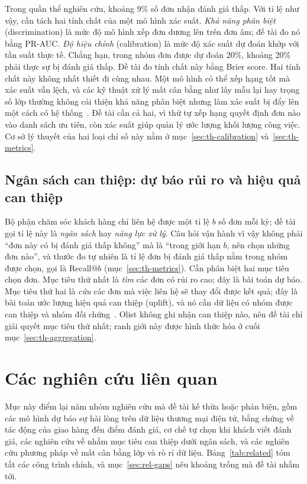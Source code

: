 \documentclass[12pt,a4paper]{report}
\begin{document}
Trong quần thể nghiên cứu, khoảng 9\% số đơn nhận đánh giá thấp. Với tỉ lệ như vậy, cần tách hai tính chất của một mô hình xác suất. \emph{Khả năng phân biệt} (discrimination) là mức độ mô hình xếp đơn dương lên trên đơn âm; đề tài đo nó bằng PR-AUC. \emph{Độ hiệu chỉnh} (calibration) là mức độ xác suất dự đoán khớp với tần suất thực tế. Chẳng hạn, trong nhóm đơn được dự đoán 20\%, khoảng 20\% phải thực sự bị đánh giá thấp. Đề tài đo tính chất này bằng Brier score. Hai tính chất này không nhất thiết đi cùng nhau. Một mô hình có thể xếp hạng tốt mà xác suất vẫn lệch, và các kỹ thuật xử lý mất cân bằng như lấy mẫu lại hay trọng số lớp thường không cải thiện khả năng phân biệt nhưng làm xác suất bị đẩy lên một cách có hệ thống~\parencite{vandengoorbergh2022}. Đề tài cần cả hai, vì thứ tự xếp hạng quyết định đơn nào vào danh sách ưu tiên, còn xác suất giúp quản lý ước lượng khối lượng công việc. Cơ sở lý thuyết của hai loại chỉ số này nằm ở mục~\ref{sec:th-calibration} và~\ref{sec:th-metrics}.

\subsection{Ngân sách can thiệp: dự báo rủi ro và hiệu quả can thiệp}\label{sec:con-budget}

Bộ phận chăm sóc khách hàng chỉ liên hệ được một tỉ lệ $b$ số đơn mỗi kỳ; đề tài gọi tỉ lệ này là \emph{ngân sách} hay \emph{năng lực xử lý}. Câu hỏi vận hành vì vậy không phải ``đơn này có bị đánh giá thấp không'' mà là ``trong giới hạn $b$, nên chọn những đơn nào'', và thước đo tự nhiên là tỉ lệ đơn bị đánh giá thấp nằm trong nhóm được chọn, gọi là Recall@$b$ (mục~\ref{sec:th-metrics}). Cần phân biệt hai mục tiêu chọn đơn. Mục tiêu thứ nhất là \emph{tìm} các đơn có rủi ro cao; đây là bài toán dự báo. Mục tiêu thứ hai là \emph{cứu} các đơn mà việc liên hệ sẽ thay đổi được kết quả; đây là bài toán ước lượng hiệu quả can thiệp (uplift), và nó cần dữ liệu có nhóm được can thiệp và nhóm đối chứng~\parencite{ascarza2018}. Olist không ghi nhận can thiệp nào, nên đề tài chỉ giải quyết mục tiêu thứ nhất; ranh giới này được hình thức hóa ở cuối mục~\ref{sec:th-aggregation}.

\section{Các nghiên cứu liên quan}\label{sec:related}

Mục này điểm lại năm nhóm nghiên cứu mà đề tài kế thừa hoặc phản biện, gồm các mô hình dự báo sự hài lòng trên dữ liệu thương mại điện tử, bằng chứng về tác động của giao hàng đến điểm đánh giá, cơ chế tự chọn khi khách viết đánh giá, các nghiên cứu về nhắm mục tiêu can thiệp dưới ngân sách, và các nghiên cứu phương pháp về mất cân bằng lớp và rò rỉ dữ liệu. Bảng~\ref{tab:related} tóm tắt các công trình chính, và mục~\ref{sec:rel-gaps} nêu khoảng trống mà đề tài nhắm tới.
\end{document}
